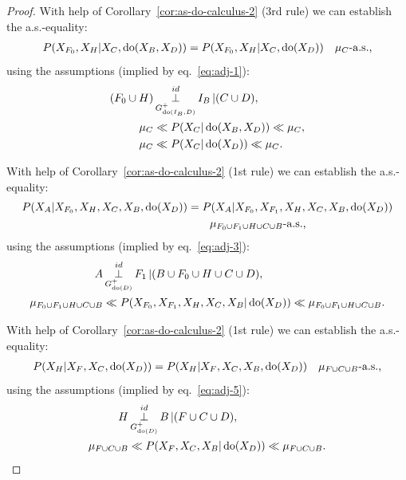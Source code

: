\begin{Thm}
\begin{proof}
With help of Corollary~\ref{cor:as-do-calculus-2} (3rd rule) we can establish the a.s.-equality:
    \begin{align}
        P(X_{F_0},X_H|X_C,\operatorname{do}(X_B,X_D)) &= P(X_{F_0},X_H|X_C,\operatorname{do}(X_D)) 
         &\mu_C\text{-a.s.,} \label{eq:adj-eq-7}
    \end{align}
    using the assumptions (implied by eq.\ \ref{eq:adj-1}):
\begin{align*}
    (F_0 \cup H) & \operatorname*{\perp}^{id}_{G^+_{\operatorname{do}(I_B,D)}} I_B \operatorname*{|} (C \cup D),\\
    \mu_C & \ll P(X_C|\operatorname{do}(X_B,X_D)) \ll \mu_C,\\
    \mu_C & \ll P(X_C|\operatorname{do}(X_D)) \ll \mu_C.
\end{align*}

With help of Corollary~\ref{cor:as-do-calculus-2} (1st rule) we can establish the a.s.-equality:
    \begin{align}
        P(X_A|X_{F_0},X_H,X_C,X_B,\operatorname{do}(X_D)) &= P(X_A|X_{F_0},X_{F_1},X_H,X_C,X_B,\operatorname{do}(X_D)) \label{eq:adj-eq-8}\\ 
                           &\qquad \mu_{F_0 \cup F_1 \cup H \cup C \cup B}\text{-a.s.,} \notag 
    \end{align}
using the assumptions (implied by eq.\ \ref{eq:adj-3}):
\begin{align*}
    A & \operatorname*{\perp}^{id}_{G^+_{\operatorname{do}(D)}} F_1 \operatorname*{|} (B \cup F_0 \cup H \cup C \cup D),\\
    \mu_{F_0 \cup F_1 \cup H \cup C \cup B} & \ll P(X_{F_0},X_{F_1},X_H,X_C,X_B|\operatorname{do}(X_D)) \ll \mu_{F_0\cup F_1  \cup H \cup C \cup B}.
\end{align*}

With help of Corollary~\ref{cor:as-do-calculus-2} (1st rule) we can establish the a.s.-equality:
    \begin{align}
        P(X_H|X_F,X_C,\operatorname{do}(X_D)) &= P(X_H|X_F,X_C,X_B,\operatorname{do}(X_D)) &\mu_{F \cup C \cup B}\text{-a.s.,} \label{eq:adj-eq-9}
    \end{align}
using the assumptions (implied by eq.\ \ref{eq:adj-5}):
\begin{align*}
    H &\operatorname*{\perp}^{id}_{G^+_{\operatorname{do}(D)}} B \operatorname*{|} (F \cup C \cup D),\\
    \mu_{F \cup C \cup B} & \ll P(X_F,X_C,X_B|\operatorname{do}(X_D)) \ll \mu_{F \cup C \cup B}.
\end{align*}


\end{proof}
\end{Thm}
